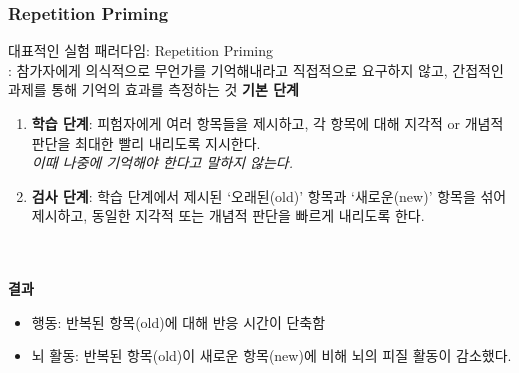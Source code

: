 \documentclass{beamer}
\begin{document}
\subsubsection{Repetition Priming}
\begin{frame}{대표적인 실험 패러다임: Repetition Priming\\\normalsize : 참가자에게 의식적으로 무언가를 기억해내라고 직접적으로 요구하지 않고, 간접적인 과제를 통해 기억의 효과를 측정하는 것}
  \large
  \textbf{기본 단계}
  \vspace{-0.5em}
  \begin{enumerate}
    \item \textbf{학습 단계}: 피험자에게 여러 항목들을 제시하고, 각 항목에 대해 지각적 or 개념적 판단을 
    최대한 빨리 내리도록 지시한다.\\
    \textit{이때 나중에 기억해야 한다고 말하지 않는다.}
  \item \textbf{검사 단계}: 학습 단계에서 제시된 `오래된(old)' 항목과 `새로운(new)' 항목을 섞어 제시하고, 
    동일한 지각적 또는 개념적 판단을 빠르게 내리도록 한다.
  \end{enumerate}\\~\\

  \textbf{결과}
  \vspace{-0.5em}
  \begin{itemize}
    \item 행동: 반복된 항목(old)에 대해 반응 시간이 단축함
    \item 뇌 활동: 반복된 항목(old)이 새로운 항목(new)에 비해 뇌의 피질 활동이 감소했다.
  \end{itemize}

\end{frame}
\end{document}

